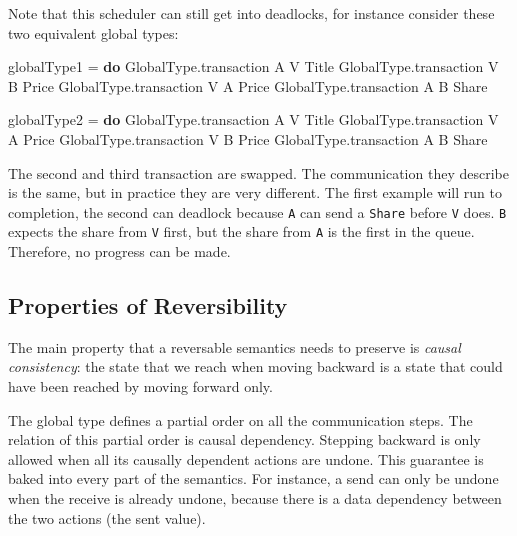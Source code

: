 \documentclass[runningheads,plain]{llncs}
\newenvironment{Shaded}{}{}
\newcommand{\KeywordTok}[1]{\textcolor[rgb]{0.00,0.44,0.13}{\textbf{#1}}}
\newcommand{\DataTypeTok}[1]{\textcolor[rgb]{0.56,0.13,0.00}{#1}}
\newcommand{\FunctionTok}[1]{\textcolor[rgb]{0.02,0.16,0.49}{#1}}
\newcommand{\NormalTok}[1]{#1}
\begin{document}
Note that this scheduler can still get into deadlocks, for instance
consider these two equivalent global types:

\begin{Shaded}
\begin{Highlighting}[]
\NormalTok{globalType1 }\FunctionTok{=} \KeywordTok{do} 
\NormalTok{    GlobalType.transaction }\DataTypeTok{A} \DataTypeTok{V} \DataTypeTok{Title} 
\NormalTok{    GlobalType.transaction }\DataTypeTok{V} \DataTypeTok{B} \DataTypeTok{Price} 
\NormalTok{    GlobalType.transaction }\DataTypeTok{V} \DataTypeTok{A} \DataTypeTok{Price} 
\NormalTok{    GlobalType.transaction }\DataTypeTok{A} \DataTypeTok{B} \DataTypeTok{Share} 

\NormalTok{globalType2 }\FunctionTok{=} \KeywordTok{do} 
\NormalTok{    GlobalType.transaction }\DataTypeTok{A} \DataTypeTok{V} \DataTypeTok{Title} 
\NormalTok{    GlobalType.transaction }\DataTypeTok{V} \DataTypeTok{A} \DataTypeTok{Price} 
\NormalTok{    GlobalType.transaction }\DataTypeTok{V} \DataTypeTok{B} \DataTypeTok{Price} 
\NormalTok{    GlobalType.transaction }\DataTypeTok{A} \DataTypeTok{B} \DataTypeTok{Share} 
\end{Highlighting}
\end{Shaded}

The second and third transaction are swapped. The communication they describe
is the same, but in practice they are very different. The first example will
run to completion, the second can deadlock because \texttt{A} can
send a \texttt{Share} before \texttt{V} does. \texttt{B} expects the
share from \texttt{V} first, but the share from \texttt{A} is the first
in the queue. Therefore, no progress can be made.

\subsection{Properties of
Reversibility}\label{properties-of-reversibility}

The main property that a reversable semantics needs to preserve is
\emph{causal consistency}: the state that we reach when moving backward
is a state that could have been reached by moving forward only.

The global type defines a partial order on all the communication steps.
The relation of this partial order is causal dependency. Stepping
backward is only allowed when all its causally dependent actions are
undone. This guarantee is baked into every part of the semantics. For
instance, a send can only be undone when the receive is already undone,
because there is a data dependency between the two actions (the sent
value).
\end{document}
